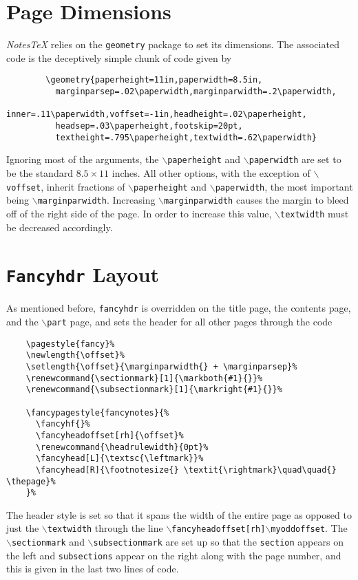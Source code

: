 \documentclass[10pt]{article}
\begin{document}
\section{Page Dimensions}
\textit{NotesTeX} relies on the \texttt{geometry} package to set its dimensions. The associated code is the deceptively simple chunk of code given by
\begin{verbatim}
		\geometry{paperheight=11in,paperwidth=8.5in,
          marginparsep=.02\paperwidth,marginparwidth=.2\paperwidth,
          inner=.11\paperwidth,voffset=-1in,headheight=.02\paperheight,
          headsep=.03\paperheight,footskip=20pt,
          textheight=.795\paperheight,textwidth=.62\paperwidth}
	\end{verbatim}
Ignoring most of the arguments, the \texttt{\( \backslash \)paperheight} and \texttt{\( \backslash \)paperwidth} are set to be the standard \(8.5\times11\) inches. All other options, with the exception of \texttt{\( \backslash \)voffset}, inherit fractions of \texttt{\( \backslash \)paperheight} and \texttt{\( \backslash \)paperwidth}, the most important being \texttt{\( \backslash \)marginparwidth}. Increasing \texttt{\( \backslash \)marginparwidth} causes the margin to bleed off of the right side of the page. In order to increase this value, \texttt{\( \backslash \)textwidth} must be decreased accordingly.


\section{\texttt{Fancyhdr} Layout}
As mentioned before, \texttt{fancyhdr} is overridden on the title page, the contents page, and the \texttt{\( \backslash \)part} page, and sets the header for all other pages through the code
\begin{verbatim}
	\pagestyle{fancy}%
	\newlength{\offset}%
	\setlength{\offset}{\marginparwidth{} + \marginparsep}%
	\renewcommand{\sectionmark}[1]{\markboth{#1}{}}%
	\renewcommand{\subsectionmark}[1]{\markright{#1}{}}%

	\fancypagestyle{fancynotes}{%
	  \fancyhf{}%
	  \fancyheadoffset[rh]{\offset}%
	  \renewcommand{\headrulewidth}{0pt}%
	  \fancyhead[L]{\textsc{\leftmark}}%
	  \fancyhead[R]{\footnotesize{} \textit{\rightmark}\quad\quad{} \thepage}%
	}%
	\end{verbatim}
The header style is set so that it spans the width of the entire page as opposed to just the \texttt{\( \backslash \)textwidth} through the line \texttt{\( \backslash \)fancyheadoffset[rh]\textbraceleft\( \backslash \)myoddoffset\textbraceright}. The \texttt{\( \backslash \)sectionmark} and \texttt{\( \backslash \)subsectionmark} are set up so that the \texttt{section} appears on the left and \texttt{subsections} appear on the right along with the page number, and this is given in the last two lines of code.
\end{document}
